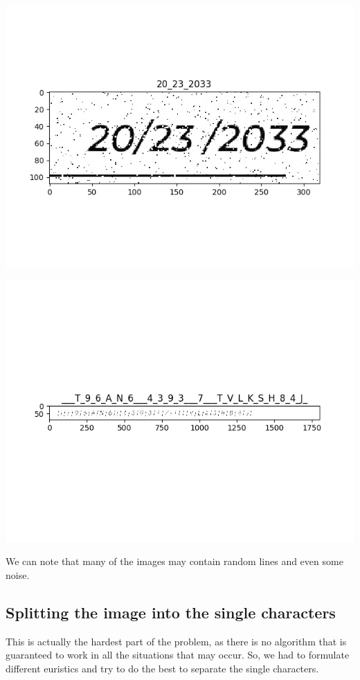 \documentclass[11pt]{article}
\makeatletter
\def\maxwidth{\ifdim\Gin@nat@width>\linewidth\linewidth
    \else\Gin@nat@width\fi}
\let\Oldincludegraphics\includegraphics
\renewcommand{\includegraphics}[1]{\Oldincludegraphics[width=.8\maxwidth]{#1}}
\makeatother
\begin{document}
\includegraphics{imgs/A2.png}

\includegraphics{imgs/A4.png}

We can note that many of the images may contain random lines and even
some noise.

\hypertarget{splitting-the-image-into-the-single-characters}{%
\subsection{Splitting the image into the single
characters}\label{splitting-the-image-into-the-single-characters}}

This is actually the hardest part of the problem, as there is no
algorithm that is guaranteed to work in all the situations that may
occur. So, we had to formulate different euristics and try to do the
best to separate the single characters.
\end{document}

